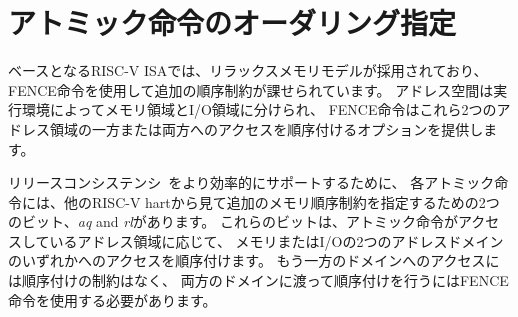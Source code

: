 \begin{comment}
\section{Specifying Ordering of Atomic Instructions}
\end{comment}
\section{アトミック命令のオーダリング指定}

\begin{comment}
The base RISC-V ISA has a relaxed memory model, with the FENCE
instruction used to impose additional ordering constraints.  The
address space is divided by the execution environment into memory and
I/O domains, and the FENCE instruction provides options to order
accesses to one or both of these two address domains.
\end{comment}

ベースとなるRISC-V ISAでは、リラックスメモリモデルが採用されており、
FENCE命令を使用して追加の順序制約が課せられています。
アドレス空間は実行環境によってメモリ領域とI/O領域に分けられ、
FENCE命令はこれら2つのアドレス領域の一方または両方へのアクセスを順序付けるオプションを提供します。

\begin{comment}
To provide more efficient support for release
consistency~\cite{Gharachorloo90memoryconsistency}, each atomic
instruction has two bits, {\em aq} and {\em rl}, used to specify
additional memory ordering constraints as viewed by other RISC-V
harts.  The bits order accesses to one of the two address domains,
memory or I/O, depending on which address domain the atomic
instruction is accessing.  No ordering constraint is implied to
accesses to the other domain, and a FENCE instruction should be used
to order across both domains.
\end{comment}

リリースコンシステンシ~\cite{Gharachorloo90memoryconsistency}をより効率的にサポートするために、
各アトミック命令には、他のRISC-V hartから見て追加のメモリ順序制約を指定するための2つのビット、{\em aq} and {\em rl}があります。
これらのビットは、アトミック命令がアクセスしているアドレス領域に応じて、
メモリまたはI/Oの2つのアドレスドメインのいずれかへのアクセスを順序付けます。
もう一方のドメインへのアクセスには順序付けの制約はなく、
両方のドメインに渡って順序付けを行うにはFENCE命令を使用する必要があります。

